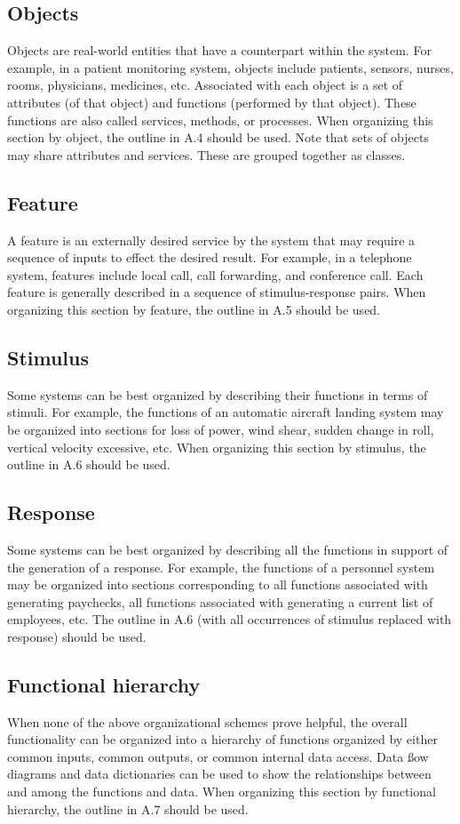 	\subsection{Objects}
		Objects are real-world entities that have a counterpart within the system. For example, in a patient monitoring system, objects include patients, sensors, nurses, rooms, physicians, medicines, etc. Associated with each object is a set of attributes (of that object) and functions (performed by that object). These functions are also called services, methods, or processes. When organizing this section by object, the outline in A.4 should be used. Note that sets of objects may share attributes and services. These are grouped together as classes.
	
	\subsection{Feature}
		A feature is an externally desired service by the system that may require a sequence of inputs to effect the desired result. For example, in a telephone system, features include local call, call forwarding, and conference call. Each feature is generally described in a sequence of stimulus-response pairs. When organizing this section by feature, the outline in A.5 should be used.
	
	\subsection{Stimulus}
		Some systems can be best organized by describing their functions in terms of stimuli. For example, the functions of an automatic aircraft landing system may be organized into sections for loss of power, wind shear, sudden change in roll, vertical velocity excessive, etc. When organizing this section by stimulus, the outline in A.6 should be used.
	
	\subsection{Response}
		Some systems can be best organized by describing all the functions in support of the generation of a response. For example, the functions of a personnel system may be organized into sections corresponding to all functions associated with generating paychecks, all functions associated with generating a current list of employees, etc. The outline in A.6 (with all occurrences of stimulus replaced with response) should be used.
	
	\subsection{Functional hierarchy}
		When none of the above organizational schemes prove helpful, the overall functionality can be organized into a hierarchy of functions organized by either common inputs, common outputs, or common internal data access. Data ßow diagrams and data dictionaries can be used to show the relationships between and among the functions and data. When organizing this section by functional hierarchy, the outline in A.7 should be
used.
	